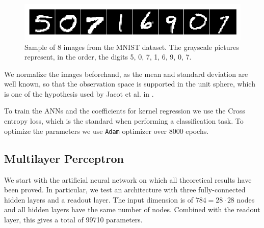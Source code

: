 \documentclass[11pt,notitlepage]{article}
\numberwithin{equation}{section}
\theoremstyle{remark}
\theoremstyle{definition}
\begin{document}
	\begin{figure}[h!]
		\centering
		\includegraphics[width=.75\linewidth]{../Simulations/figures/mnist_sample.png}
		\caption{Sample of 8 images from the MNIST dataset.
		The grayscale pictures represent, in the order, the digits 5, 0, 7, 1, 6, 9, 0, 7.}
	\end{figure}
	
	We normalize the images beforehand, as the mean and standard deviation are well known, so that the observation space is supported in the unit sphere, which is one of the hypothesis used by Jacot et al. in \cite{jacot2018neural}.
	
	To train the ANNs and the coefficients for kernel regression we use the Cross entropy loss, which is the standard when performing a classification task.
	To optimize the parameters we use \verb|Adam| optimizer \cite{kingma2014adam} over 8000 epochs.
	
	\subsection{Multilayer Perceptron}
	
	We start with the artificial neural network on which all theoretical results have been proved.
	In particular, we test an architecture with three fully-connected hidden layers and a readout layer.
	The input dimension is of $784 = 28 \cdot 28$ nodes and all hidden layers have the same number of nodes.
	Combined with the readout layer, this gives a total of 99710 parameters.
	
\end{document}
